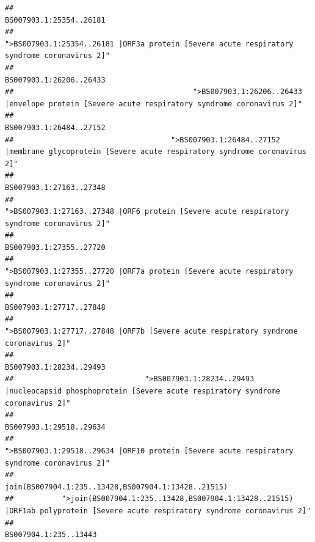 \documentclass[
]{article}
\begin{document}
\begin{verbatim}
##                                                                                                                BS007903.1:25354..26181 
##                                            ">BS007903.1:25354..26181 |ORF3a protein [Severe acute respiratory syndrome coronavirus 2]" 
##                                                                                                                BS007903.1:26206..26433 
##                                         ">BS007903.1:26206..26433 |envelope protein [Severe acute respiratory syndrome coronavirus 2]" 
##                                                                                                                BS007903.1:26484..27152 
##                                    ">BS007903.1:26484..27152 |membrane glycoprotein [Severe acute respiratory syndrome coronavirus 2]" 
##                                                                                                                BS007903.1:27163..27348 
##                                             ">BS007903.1:27163..27348 |ORF6 protein [Severe acute respiratory syndrome coronavirus 2]" 
##                                                                                                                BS007903.1:27355..27720 
##                                            ">BS007903.1:27355..27720 |ORF7a protein [Severe acute respiratory syndrome coronavirus 2]" 
##                                                                                                                BS007903.1:27717..27848 
##                                                    ">BS007903.1:27717..27848 |ORF7b [Severe acute respiratory syndrome coronavirus 2]" 
##                                                                                                                BS007903.1:28234..29493 
##                              ">BS007903.1:28234..29493 |nucleocapsid phosphoprotein [Severe acute respiratory syndrome coronavirus 2]" 
##                                                                                                                BS007903.1:29518..29634 
##                                            ">BS007903.1:29518..29634 |ORF10 protein [Severe acute respiratory syndrome coronavirus 2]" 
##                                                                                    join(BS007904.1:235..13428,BS007904.1:13428..21515) 
##           ">join(BS007904.1:235..13428,BS007904.1:13428..21515) |ORF1ab polyprotein [Severe acute respiratory syndrome coronavirus 2]" 
##                                                                                                                  BS007904.1:235..13443 

\end{verbatim}
\end{document}
